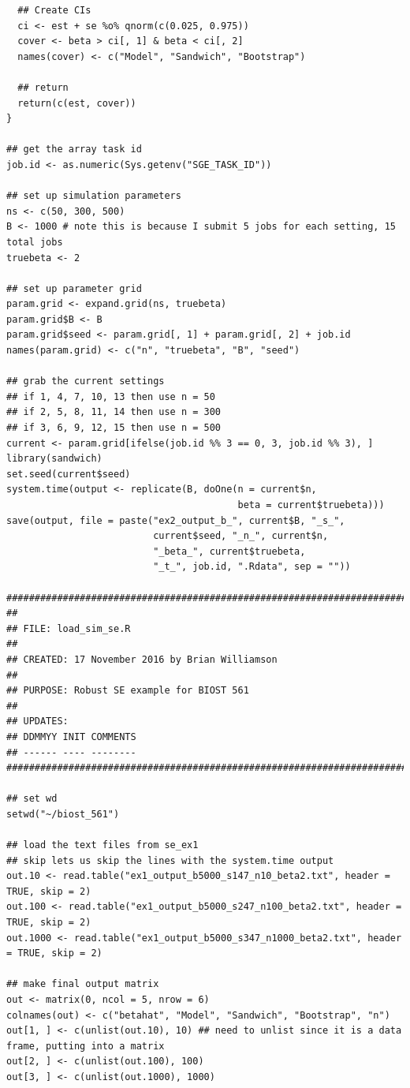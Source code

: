 \documentclass{article}
\begin{document}
\begin{enumerate}
{\begin{verbatim}
  ## Create CIs
  ci <- est + se %o% qnorm(c(0.025, 0.975))
  cover <- beta > ci[, 1] & beta < ci[, 2]
  names(cover) <- c("Model", "Sandwich", "Bootstrap")
  
  ## return
  return(c(est, cover))
}

## get the array task id
job.id <- as.numeric(Sys.getenv("SGE_TASK_ID"))

## set up simulation parameters
ns <- c(50, 300, 500)
B <- 1000 # note this is because I submit 5 jobs for each setting, 15 total jobs
truebeta <- 2

## set up parameter grid
param.grid <- expand.grid(ns, truebeta)
param.grid$B <- B
param.grid$seed <- param.grid[, 1] + param.grid[, 2] + job.id
names(param.grid) <- c("n", "truebeta", "B", "seed")

## grab the current settings
## if 1, 4, 7, 10, 13 then use n = 50
## if 2, 5, 8, 11, 14 then use n = 300
## if 3, 6, 9, 12, 15 then use n = 500
current <- param.grid[ifelse(job.id %% 3 == 0, 3, job.id %% 3), ]
library(sandwich)
set.seed(current$seed)
system.time(output <- replicate(B, doOne(n = current$n, 
                                         beta = current$truebeta)))
save(output, file = paste("ex2_output_b_", current$B, "_s_", 
                          current$seed, "_n_", current$n, 
                          "_beta_", current$truebeta, 
                          "_t_", job.id, ".Rdata", sep = ""))
                          
#########################################################################
##
## FILE: load_sim_se.R
##
## CREATED: 17 November 2016 by Brian Williamson
##
## PURPOSE: Robust SE example for BIOST 561
##
## UPDATES:
## DDMMYY INIT COMMENTS
## ------ ---- --------
#########################################################################

## set wd
setwd("~/biost_561")

## load the text files from se_ex1
## skip lets us skip the lines with the system.time output
out.10 <- read.table("ex1_output_b5000_s147_n10_beta2.txt", header = TRUE, skip = 2)
out.100 <- read.table("ex1_output_b5000_s247_n100_beta2.txt", header = TRUE, skip = 2)
out.1000 <- read.table("ex1_output_b5000_s347_n1000_beta2.txt", header = TRUE, skip = 2)

## make final output matrix
out <- matrix(0, ncol = 5, nrow = 6)
colnames(out) <- c("betahat", "Model", "Sandwich", "Bootstrap", "n")
out[1, ] <- c(unlist(out.10), 10) ## need to unlist since it is a data frame, putting into a matrix
out[2, ] <- c(unlist(out.100), 100)
out[3, ] <- c(unlist(out.1000), 1000)


\end{verbatim}}
\end{enumerate}
\end{document}

